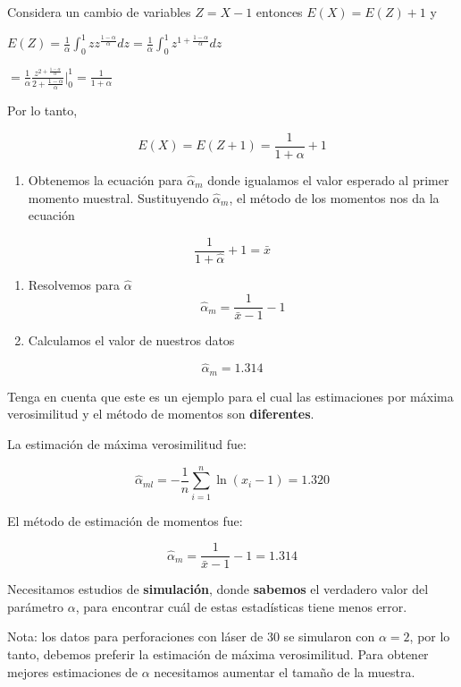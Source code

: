\documentclass[
]{book}
\providecommand{\tightlist}{%
  \setlength{\itemsep}{0pt}\setlength{\parskip}{0pt}}
\begin{document}
Considera un cambio de variables \(Z=X-1\) entonces \(E(X)=E(Z)+1\) y

\(E(Z)= \frac{1}{\alpha} \int_0^1 zz^{\frac{1-\alpha}{\alpha}}dz= \frac{1}{\alpha} \int_0^1 z^{1+\frac{1-\alpha}{\alpha}}dz\)

\(= \frac{1}{\alpha} \frac{z^{2+\frac{1-\alpha}{\alpha}}}{{2+\frac{1-\alpha}{\alpha}} } |_0^1=\frac{1}{1+\alpha}\)

Por lo tanto,

\[E(X)=E(Z+1)=\frac{1}{1+\alpha}+1\]

\begin{enumerate}
\def\labelenumi{\arabic{enumi}.}
\setcounter{enumi}{1}
\tightlist
\item
  Obtenemos la ecuación para \(\hat{\alpha}_m\) donde igualamos el valor esperado al primer momento muestral. Sustituyendo \(\hat{\alpha}_m\), el método de los momentos nos da la ecuación
\end{enumerate}

\[\frac{1}{1+\hat{\alpha}}+1=\bar{x}\]

\begin{enumerate}
\def\labelenumi{\arabic{enumi}.}
\setcounter{enumi}{2}
\item
  Resolvemos para \(\hat{\alpha}\) \[\hat{\alpha}_m=\frac{1}{\bar{x}-1}-1\]
\item
  Calculamos el valor de nuestros datos
\end{enumerate}

\[\hat{\alpha}_m=1.314\]

Tenga en cuenta que este es un ejemplo para el cual las estimaciones por máxima verosimilitud y el método de momentos son \textbf{diferentes}.

La estimación de máxima verosimilitud fue:

\[\hat{\alpha}_{ml}=-\frac{1}{n}\sum_{i=1}^n \ln (x_i-1)=1.320\]

El método de estimación de momentos fue:

\[\hat{\alpha}_m=\frac{1}{\bar{x}-1}-1=1.314\]

Necesitamos estudios de \textbf{simulación}, donde \textbf{sabemos} el verdadero valor del parámetro \(\alpha\), para encontrar cuál de estas estadísticas tiene menos error.

Nota: los datos para perforaciones con láser de \(30\) se simularon con \(\alpha=2\), por lo tanto, debemos preferir la estimación de máxima verosimilitud. Para obtener mejores estimaciones de \(\alpha\) necesitamos aumentar el tamaño de la muestra.
\end{document}

